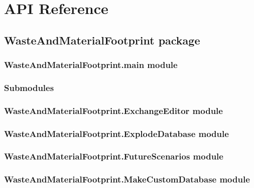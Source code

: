 \documentclass[letterpaper,10pt,english]{sphinxmanual}
\begin{document}
\sphinxstepscope


\chapter{API Reference}
\label{\detokenize{modules:api-reference}}\label{\detokenize{modules::doc}}
\sphinxstepscope


\section{WasteAndMaterialFootprint package}
\label{\detokenize{WasteAndMaterialFootprint:wasteandmaterialfootprint-package}}\label{\detokenize{WasteAndMaterialFootprint::doc}}

\subsection{WasteAndMaterialFootprint.main module}
\label{\detokenize{WasteAndMaterialFootprint:wasteandmaterialfootprint-main-module}}

\subsection{Submodules}
\label{\detokenize{WasteAndMaterialFootprint:submodules}}

\subsection{WasteAndMaterialFootprint.ExchangeEditor module}
\label{\detokenize{WasteAndMaterialFootprint:wasteandmaterialfootprint-exchangeeditor-module}}

\subsection{WasteAndMaterialFootprint.ExplodeDatabase module}
\label{\detokenize{WasteAndMaterialFootprint:wasteandmaterialfootprint-explodedatabase-module}}

\subsection{WasteAndMaterialFootprint.FutureScenarios module}
\label{\detokenize{WasteAndMaterialFootprint:wasteandmaterialfootprint-futurescenarios-module}}

\subsection{WasteAndMaterialFootprint.MakeCustomDatabase module}
\label{\detokenize{WasteAndMaterialFootprint:wasteandmaterialfootprint-makecustomdatabase-module}}
\end{document}
